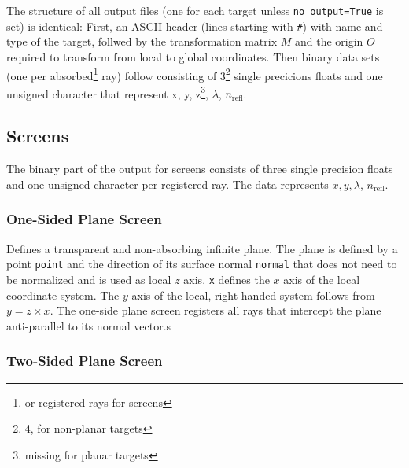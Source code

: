 \documentclass[10pt,a4paper,titlepage]{article}
\begin{document}
The structure of all output files (one for each target unless {\tt no\_output=True} is set) is identical: First, an ASCII header (lines starting with {\tt \#}) with name and type of the target, follwed by the transformation matrix $M$ and the origin $O$ required to transform from local to global coordinates. Then binary data sets (one per absorbed\footnote{or registered rays for screens} ray) follow consisting of 3\footnote{4, for non-planar targets} single precicions floats and one unsigned character that represent x, y, z\footnote{missing for planar targets}, $\lambda$, $n_{\mathrm{refl}}$.


\subsection{Screens}

The binary part of the output for screens consists of three single precision floats and one unsigned character per registered ray. The data represents $x, y, \lambda$, $n_{\mathrm{refl}}$.

\subsubsection{One-Sided Plane Screen}






\vspace{0.25cm}
Defines a transparent and non-absorbing infinite plane. The plane is defined by a point {\tt point} and the direction of its surface normal {\tt normal} that does not need to be normalized and is used as local $z$ axis. {\tt x} defines the $x$ axis of the local coordinate system. The $y$ axis of the local, right-handed system follows from $y=z \times x$. The one-side plane screen registers all rays that intercept the plane anti-parallel to its normal vector.s


\subsubsection{Two-Sided Plane Screen}

\end{document}
